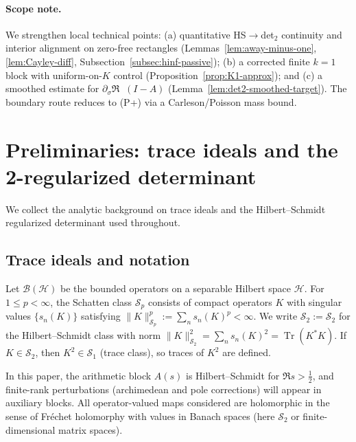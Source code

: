 \documentclass[11pt]{article}
\theoremstyle{definition}
\theoremstyle{remark}
\newcommand{\HS}{\mathcal{S}_2}
\DeclareMathOperator{\Tr}{Tr}
\DeclareMathOperator{\dettwo}{det_2}
\begin{document}
\paragraph{Scope note.} We strengthen local technical points: (a) quantitative HS$\to$det$_2$ continuity and interior alignment on zero-free rectangles (Lemmas~\ref{lem:away-minus-one}, \ref{lem:Cayley-diff}, Subsection~\ref{subsec:hinf-passive}); (b) a corrected finite $k{=}1$ block with uniform-on-$K$ control (Proposition~\ref{prop:K1-approx}); and (c) a smoothed estimate for $\partial_\sigma\Re\dettwo(I-A)$ (Lemma~\ref{lem:det2-smoothed-target}). The boundary route reduces to (P+) via a Carleson/Poisson mass bound.

\section{Preliminaries: trace ideals and the 2-regularized determinant}
We collect the analytic background on trace ideals and the Hilbert--Schmidt regularized determinant used throughout.

\subsection{Trace ideals and notation}
Let \(\mathcal{B}(\mathcal{H})\) be the bounded operators on a separable Hilbert space \(\mathcal{H}\). For \(1\le p<\infty\), the Schatten class \(\mathcal{S}_p\) consists of compact operators \(K\) with singular values \(\{s_n(K)\}\) satisfying \(\|K\|_{\mathcal{S}_p}^p:=\sum_n s_n(K)^p<\infty\). We write \(\HS:=\mathcal{S}_2\) for the Hilbert--Schmidt class with norm \(\|K\|_{\HS}^2=\sum_n s_n(K)^2=\Tr(K^*K)\). If \(K\in\HS\), then \(K^2\in \mathcal{S}_1\) (trace class), so traces of \(K^2\) are defined.

In this paper, the arithmetic block \(A(s)\) is Hilbert--Schmidt for \(\Re s>\tfrac12\), and finite-rank perturbations (archimedean and pole corrections) will appear in auxiliary blocks. All operator-valued maps considered are holomorphic in the sense of Fr\'echet holomorphy with values in Banach spaces (here \(\HS\) or finite-dimensional matrix spaces).
\end{document}
